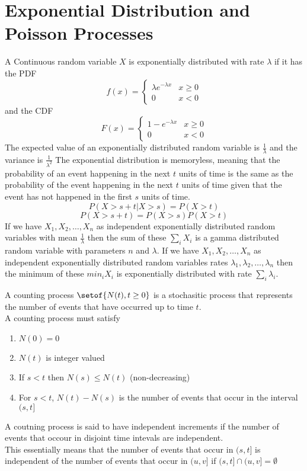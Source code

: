 \documentclass[answers,12pt,addpoints]{exam}
\begin{document}
\section*{Exponential Distribution and Poisson Processes}
\begin{definition}
    A Continuous random variable $X$ is exponentially distributed with rate $\lambda$ if it has the PDF
    $$f(x) = \begin{cases}
        \lambda e^{-\lambda x} & x \geq 0\\
        0 & x < 0
    \end{cases}$$
    and the CDF
    $$F(x) = \begin{cases}
        1 - e^{-\lambda x} & x \geq 0\\
        0 & x < 0
    \end{cases}$$
    The expected value of an exponentially distributed random variable is $\frac{1}{\lambda}$ and the variance is $\frac{1}{\lambda^2}$
    The exponential distribution is memoryless, meaning that the probability of an event happening in the next $t$ units of time is the same as the probability of the event happening in the next $t$ units of time given that the event has not happened in the first $s$ units of time.
    $$P(X > s+t | X > s) = P(X > t)$$
    $$P(X > s+t) = P(X > s)P(X > t)$$
    If we have $X_1, X_2, \ldots, X_n$ as independent exponentially distributed random variables with mean $\frac{1}{\lambda}$ then the sum of these $\sum_i X_i$ is a gamma distributed random variable with parameters $n$ and $\lambda$.
    If we have $X_1, X_2, \ldots, X_n$ as independent exponentially distributed random variables rates $\lambda_1, \lambda_2, \ldots, \lambda_n$ then the minimum of these $min_i X_i$ is exponentially distributed with rate $\sum_i \lambda_i$.
\end{definition}
\begin{definition}
    A counting process $\setof{N(t), t \geq 0}$ is a stochasitic process that represents the number of events that have occurred up to time $t$.\\
    A counting process must satisfy
    \begin{enumerate}
        \item $N(0) = 0$
        \item $N(t)$ is integer valued
        \item If $s < t$ then $N(s) \leq N(t)$ (non-decreasing)
        \item For $s < t$, $N(t) - N(s)$ is the number of events that occur in the interval $(s,t]$
    \end{enumerate}
    A coutning process is said to have independent increments if the number of events that occour in disjoint time intevals are independent.\\
    This essentially means that the number of events that occur in $(s,t]$ is independent of the number of events that occur in $(u,v]$ if $(s,t] \cap (u,v] = \emptyset$
\end{definition}
\end{document}
